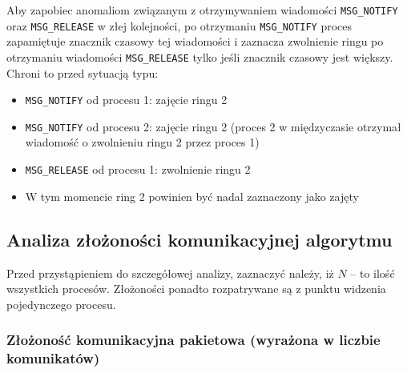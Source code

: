 \documentclass{article}
\begin{document}
Aby zapobiec anomaliom związanym z otrzymywaniem wiadomości
\verb|MSG_NOTIFY| oraz \verb|MSG_RELEASE| w złej kolejności, po
otrzymaniu \verb|MSG_NOTIFY| proces zapamiętuje znacznik czasowy tej
wiadomości i zaznacza zwolnienie ringu po otrzymaniu wiadomości \verb|MSG_RELEASE|
tylko jeśli znacznik czasowy jest większy. Chroni to przed sytuacją
typu:
\begin{itemize}
    \item \verb|MSG_NOTIFY| od procesu 1: zajęcie ringu 2
    \item \verb|MSG_NOTIFY| od procesu 2: zajęcie ringu 2 (proces 2 w
    międzyczasie otrzymał wiadomość o zwolnieniu ringu 2 przez proces 1)
    \item \verb|MSG_RELEASE| od procesu 1: zwolnienie ringu 2
    \item W tym momencie ring 2 powinien być nadal zaznaczony jako
    zajęty
\end{itemize}



\subsection{Analiza złożoności komunikacyjnej algorytmu}

Przed przystąpieniem do szczegółowej analizy, zaznaczyć należy, iż $N$ --
to ilość wszystkich procesów. Złożoności ponadto rozpatrywane są z punktu
widzenia pojedynczego procesu.

\subsubsection{Złożoność komunikacyjna pakietowa (wyrażona w liczbie komunikatów)}
\end{document}
